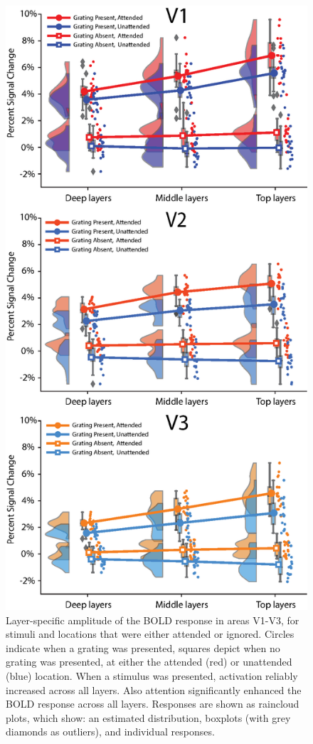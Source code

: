 \documentclass[9pt,lineno]{aperture}
\begin{document}
\begin{figure}
\includegraphics[width=0.6\linewidth]{img/layer_region_stats_600.eps}
\caption{Layer-specific amplitude of the BOLD response in areas V1-V3, for stimuli and locations that were either attended or ignored. Circles indicate when a grating was presented, squares depict when no grating was presented, at either the attended (red) or unattended (blue) location. When a stimulus was presented, activation reliably increased across all layers. Also attention significantly enhanced the BOLD response across all layers. Responses are shown as raincloud plots, which show: an estimated distribution, boxplots (with grey diamonds as outliers), and individual responses.}
\label{fig:layer_region_stats_600}


\end{figure}
\end{document}
